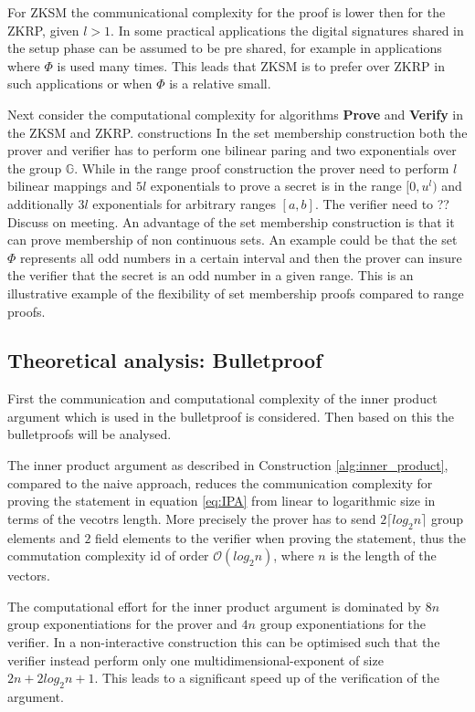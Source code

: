 For ZKSM the communicational complexity for the proof is lower then for the ZKRP, given $l>1$. In some practical applications the digital signatures shared in the setup phase can be assumed to be pre shared, for example in applications where $\Phi$ is used many times. This leads that ZKSM is to prefer over ZKRP in such applications or when $\Phi$ is a relative small. 

Next consider the computational complexity for algorithms \textbf{Prove} and \textbf{Verify} in the ZKSM and ZKRP. constructions  In the set membership construction both the prover and verifier has to perform one bilinear paring and two exponentials over the group $\mathds{G}$. While in the range proof construction the prover need to perform $l$ bilinear mappings and $5l$ exponentials to prove a secret is in the range $[0,u^l)$ and additionally $3l$ exponentials for arbitrary ranges $[a,b]$. The verifier need to ?? Discuss on meeting.
An advantage of the set membership construction is that it can prove membership of non continuous sets. An example could be that the set $\Phi$ represents all odd numbers in a certain interval and then the prover can insure the verifier that the secret is an odd number in a given range. This is an illustrative example of the flexibility of set membership proofs compared to range proofs.

\subsection{Theoretical analysis: Bulletproof}
First the communication and computational complexity of the inner product argument which is used in the bulletproof is considered. Then based on this the bulletproofs will be analysed.

The inner product argument as described in Construction \ref{alg:inner_product}, compared to the naive approach, reduces the communication complexity for proving the statement in equation \eqref{eq:IPA} from linear to logarithmic size in terms of the vecotrs length.  More precisely the prover has to send $2\lceil log_2 n \rceil$ group elements and $2$ field elements to the verifier when proving the statement, thus the commutation complexity id of order $\mathcal{O}(log_2 n)$, where $n$ is the length of the vectors. 

The computational effort for the inner product argument is dominated by $8n$ group exponentiations for the prover and  $4n$ group exponentiations for the  verifier. In a non-interactive construction this can be optimised such that the verifier instead perform only one multidimensional-exponent of size $2n+ 2log_2n +1$. This leads to a significant speed up of the verification of the argument.     

